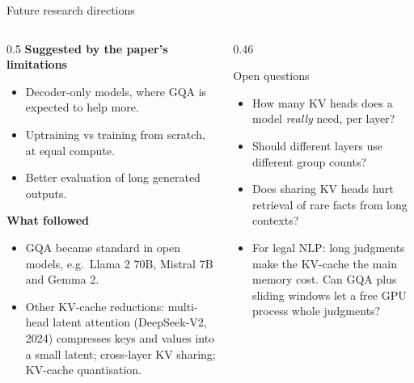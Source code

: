 \documentclass[aspectratio=169,11pt]{beamer}
\begin{document}
\begin{frame}{Future research directions}
  \begin{columns}[T]
    \begin{column}{0.5\textwidth}
      \small
      \textbf{Suggested by the paper's limitations}
      \begin{itemize}
        \item Decoder-only models, where GQA is expected to help more.
        \item Uptraining vs training from scratch, at equal compute.
        \item Better evaluation of long generated outputs.
      \end{itemize}
      \textbf{What followed}
      \begin{itemize}
        \item GQA became standard in open models, e.g.\ Llama 2 70B, Mistral 7B and Gemma 2.
        \item Other KV-cache reductions: multi-head latent attention (DeepSeek-V2, 2024) compresses keys and values into a small latent; cross-layer KV sharing; KV-cache quantisation.
      \end{itemize}
    \end{column}
    \begin{column}{0.46\textwidth}
      \begin{block}{Open questions}
        \small
        \begin{itemize}
          \item How many KV heads does a model \emph{really} need, per layer?
          \item Should different layers use different group counts?
          \item Does sharing KV heads hurt retrieval of rare facts from long contexts?
          \item For legal NLP: long judgments make the KV-cache the main memory cost. Can GQA plus sliding windows let a free GPU process whole judgments?
        \end{itemize}
      \end{block}
    \end{column}
  \end{columns}
\end{frame}
\end{document}
